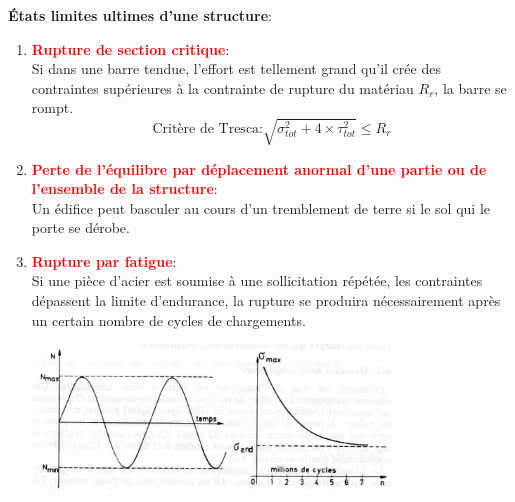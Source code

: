 \documentclass[a4paper]{article}
\begin{document}
\textbf{États limites ultimes d'une structure}: 
\begin{enumerate}[label=(\alph*)]

\item \textcolor{red}{\textbf{Rupture de section critique}}: \\
Si dans une barre tendue, l'effort est tellement grand qu'il crée des contraintes supérieures à la contrainte de rupture du matériau $ R_r $, la barre se rompt.
\[ \text{Critère de Tresca:} \sqrt{\sigma_{tot}^2 + 4 \times \tau_{tot}^2} \leq R_r \]

\item \textcolor{red}{\textbf{Perte de l'équilibre par déplacement anormal d'une partie ou de l'ensemble de la structure}}: \\
Un édifice peut basculer au cours d'un tremblement de terre si le sol qui le porte se dérobe.

\item \textcolor{red}{\textbf{Rupture par fatigue}}: \\
Si une pièce d'acier est soumise à une sollicitation répétée, les contraintes dépassent la limite d'endurance, la rupture se produira nécessairement après un certain nombre de cycles de chargements.
\begin{center}
\includegraphics[width=0.75\textwidth]{images/fatigue.PNG}    
\end{center}


\end{enumerate}
\end{document}
